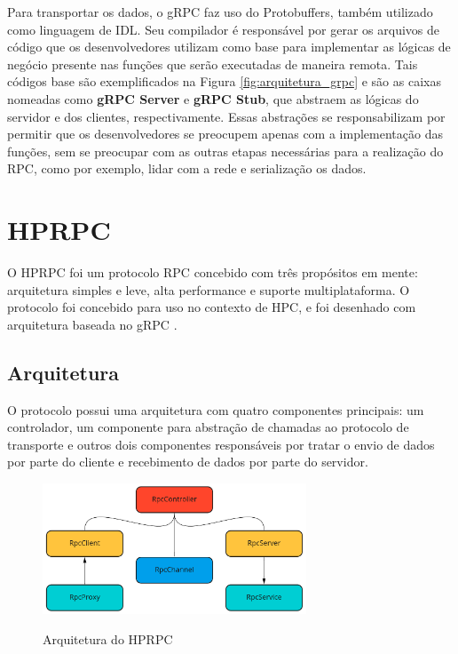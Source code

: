 Para transportar os dados, o gRPC faz uso do Protobuffers, também utilizado como linguagem de IDL. Seu compilador é responsável por gerar os arquivos de código que os desenvolvedores utilizam como base para implementar as lógicas de negócio presente nas funções que serão executadas de maneira remota. Tais códigos base são exemplificados na Figura \ref{fig:arquitetura_grpc} e são as caixas nomeadas como \textbf{gRPC Server} e \textbf{gRPC Stub}, que abstraem as lógicas do servidor e dos clientes, respectivamente. Essas abstrações se responsabilizam por permitir que os desenvolvedores se preocupem apenas com a implementação das funções, sem se preocupar com as outras etapas necessárias para a realização do RPC, como por exemplo, lidar com a rede e serialização os dados.

\section{HPRPC}

O HPRPC foi um protocolo RPC concebido com três propósitos em mente: arquitetura simples e leve, alta performance e suporte multiplataforma. O protocolo foi concebido para uso no contexto de HPC, e foi desenhado com arquitetura baseada no gRPC \cite{bagci_lightweight_2016}.

\subsection{Arquitetura}

O protocolo possui uma arquitetura com quatro componentes principais: um controlador, um componente para abstração de chamadas ao protocolo de transporte e outros dois componentes responsáveis por tratar o envio de dados por parte do cliente e recebimento de dados por parte do servidor. 

\begin{figure}[ht]
    \centering
    \caption{Arquitetura do HPRPC}
    \includegraphics[width=0.7\textwidth]{figuras/diagramas/cap2/arquitetura_hprpc.png} 
    \label{fig:arquitetura_hprpc}
\end{figure}

